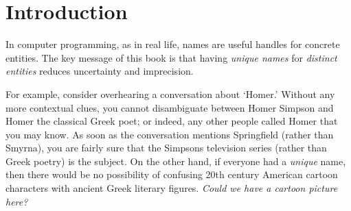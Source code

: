 \chapter{Introduction }

\graphicspath{{img/}{vanilla/img/}{part1/vanilla/img/}}




In computer programming, as in real life, 
names are useful handles for concrete entities.
The key message of this book is that
having \textit{unique names} for
\textit{distinct entities}
reduces uncertainty and imprecision.

For example, consider overhearing a conversation
about `Homer.' Without any more contextual clues, you
cannot disambiguate between Homer Simpson and Homer the
classical Greek poet; or indeed, any other people
called Homer that you may know.
As soon as the conversation mentions Springfield
(rather than Smyrna), you are fairly sure that the
Simpsons television series (rather than Greek poetry)
is the subject.
On the other hand, if everyone had a \textit{unique} name,
then there would be no possibility of confusing 20th century
American cartoon characters with ancient Greek literary figures.
\textit{Could we have a cartoon picture here?}

